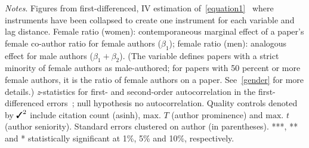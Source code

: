 \begin{table}
\begin{threeparttable}
\begin{tablenotes}
            \item \textit{Notes}. Figures from first-differenced, IV estimation of~\autoref{equation1}~\citep{Arellano1995,Blundell1998} where instruments have been collapsed to create one instrument for each variable and lag distance. Female ratio (women): contemporaneous marginal effect of a paper's female co-author ratio for female authors (\(\beta_1\)); female ratio (men): analogous effect for male authors (\(\beta_1+\beta_2\)). (The variable defines papers with a strict minority of female authors as male-authored; for papers with 50 percent or more female authors, it is the ratio of female authors on a paper. See~\autoref{gender} for more details.) \textit{z}-statistics for first- and second-order autocorrelation in the first-differenced errors~\citep{Arellano1991}; null hypothesis no autocorrelation. Quality controls denoted by \(\text{\ding{51}}^2\) include citation count (asinh), \(\text{max. }T\) (author prominence) and \(\text{max. }t\) (author seniority). Standard errors clustered on author (in parentheses). ***, ** and * statistically significant at 1\%, 5\% and 10\%, respectively.
        \end{tablenotes}
    \end{threeparttable}
\end{table}